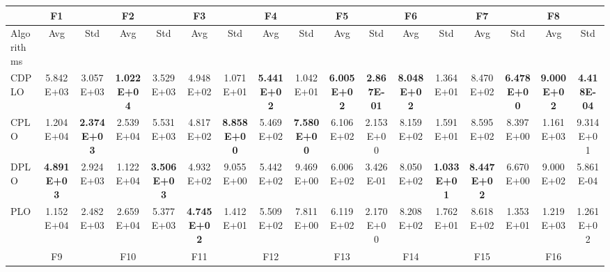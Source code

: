 \documentclass[review]{elsarticle}
\begin{document}
\begin{table}
\centering
\begin{tabular}{@{} lcccccccccccccccc @{}}
\toprule
           & F1                 &                    & F2                 &                    & F3                 &                    & F4                 &                    & F5                 &                    & F6                   &                     & F7                 &                    & F8                 &                    \\ \midrule
Algorithms & Avg                & Std                & Avg                & Std                & Avg                & Std                & Avg                & Std                & Avg                & Std                & Avg                  & Std                 & Avg                & Std                & Avg                & Std                \\
CDPLO      & 5.842E+03          & 3.057E+03          & \textbf{1.022E+04} & 3.529E+03          & 4.948E+02          & 1.071E+01          & \textbf{5.441E+02} & 1.042E+01          & \textbf{6.005E+02} & \textbf{2.867E-01} & \textbf{8.048E+02}   & 1.364E+01           & 8.470E+02          & \textbf{6.478E+00} & \textbf{9.000E+02} & \textbf{4.418E-04} \\
CPLO       & 1.204E+04          & \textbf{2.374E+03} & 2.539E+04          & 5.531E+03          & 4.817E+02          & \textbf{8.858E+00} & 5.469E+02          & \textbf{7.580E+00} & 6.106E+02          & 2.153E+00          & 8.159E+02            & 1.591E+01           & 8.595E+02          & 8.397E+00          & 1.161E+03          & 9.314E+01          \\
DPLO       & \textbf{4.891E+03} & 2.924E+03          & 1.122E+04          & \textbf{3.506E+03} & 4.932E+02          & 9.055E+00          & 5.442E+02          & 9.469E+00          & 6.006E+02          & 3.426E-01          & 8.050E+02            & \textbf{1.033E+01}  & \textbf{8.447E+02} & 6.670E+00          & 9.000E+02          & 5.861E-04          \\
PLO        & 1.152E+04          & 2.482E+03          & 2.659E+04          & 5.377E+03          & \textbf{4.745E+02} & 1.412E+01          & 5.509E+02          & 7.811E+00          & 6.119E+02          & 2.170E+00          & 8.208E+02            & 1.762E+01           & 8.618E+02          & 1.353E+01          & 1.219E+03          & 1.261E+02          \\
           & F9                 &                    & F10                &                    & F11                &                    & F12                &                    & F13                &                    & F14                  &                     & F15                &                    & F16                &                    \\

\end{tabular}
\end{table}
\end{document}
